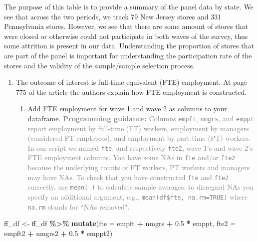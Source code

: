 \documentclass[
]{article}
\newenvironment{Shaded}{\begin{snugshade}}{\end{snugshade}}
\newcommand{\AttributeTok}[1]{\textcolor[rgb]{0.13,0.29,0.53}{#1}}
\newcommand{\FloatTok}[1]{\textcolor[rgb]{0.00,0.00,0.81}{#1}}
\newcommand{\FunctionTok}[1]{\textcolor[rgb]{0.13,0.29,0.53}{\textbf{#1}}}
\newcommand{\NormalTok}[1]{#1}
\newcommand{\OtherTok}[1]{\textcolor[rgb]{0.56,0.35,0.01}{#1}}
\newcommand{\SpecialCharTok}[1]{\textcolor[rgb]{0.81,0.36,0.00}{\textbf{#1}}}
\providecommand{\tightlist}{%
  \setlength{\itemsep}{0pt}\setlength{\parskip}{0pt}}
\begin{document}
The purpose of this table is to provide a summary of the panel data by
state. We see that across the two periods, we track 79 New Jersey stores
and 331 Pennsylvania stores. However, we see that there are some amount
of stores that were closed or otherwise could not participate in both
waves of the survey, thus some attrition is present in our data.
Understanding the proportion of stores that are part of the panel is
important for understanding the participation rate of the stores and the
validity of the sample/sample selection process.

\begin{enumerate}
\def\labelenumi{\arabic{enumi}.}
\setcounter{enumi}{11}
\tightlist
\item
  The outcome of interest is full-time equivalent (FTE) employment. At
  page 775 of the article the authors explain how FTE employment is
  constructed.

  \begin{enumerate}
  \def\labelenumii{\alph{enumii}.}
  \tightlist
  \item
    Add FTE employment for wave 1 and wave 2 as columns to your
    dataframe.
    \textcolor{gray}{\textbf{Programming guidance:} Columns \texttt{empft}, \texttt{nmgrs}, and \texttt{emppt} report employment by full-time (FT) workers, employment by managers (considered FT employees), and employment by part-time (PT) workers. In our script we named \texttt{fte}, and respectively \texttt{fte2}, wave 1's and wave 2's FTE employment columns. You have some NAs in \texttt{fte} and/or \texttt{fte2} because the underlying counts of FT workers, PT workers and managers may have NAs. To check that you have constructed \texttt{fte} and \texttt{fte2} correctly, use \texttt{mean( )} to calculate sample averages: to disregard NAs you specify an additional argument, e.g., \texttt{mean(df\$fte, na.rm=TRUE)} where \texttt{na.rm} stands for ``NAs removed".}
  \end{enumerate}
\end{enumerate}

\begin{Shaded}
\begin{Highlighting}[]
\NormalTok{ff\_df }\OtherTok{\textless{}{-}}\NormalTok{ ff\_df }\SpecialCharTok{\%\textgreater{}\%} \FunctionTok{mutate}\NormalTok{(}\AttributeTok{fte =}\NormalTok{ empft }\SpecialCharTok{+}\NormalTok{ nmgrs }\SpecialCharTok{+} \FloatTok{0.5} \SpecialCharTok{*}\NormalTok{ emppt,}
                          \AttributeTok{fte2 =}\NormalTok{ empft2 }\SpecialCharTok{+}\NormalTok{ nmgrs2 }\SpecialCharTok{+} \FloatTok{0.5} \SpecialCharTok{*}\NormalTok{ emppt2)}
\end{Highlighting}
\end{Shaded}
\end{document}

